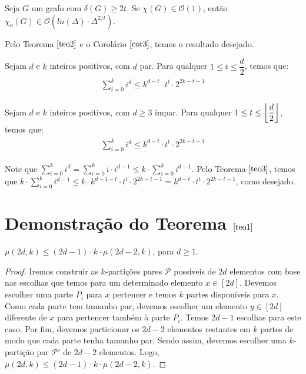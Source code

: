 \documentclass[12pt]{article}
\begin{document}
{\begin{cor}
	Seja $G$ um grafo com $\delta(G) \geq 2t$. Se $\chi(G) \in \mathcal{O}(1)$, então $\chi_o(G) \in \mathcal{O}(ln(\Delta) {\cdot} \Delta^{2/t}) $.
\end{cor}
	Pelo Teorema $\ref{teo2}$ e o Corolário $\ref{cor3}$, temos o resultado desejado. \newbegin

\begin{teo}
	\label{teo3}   
	Sejam $d$ e $k$ inteiros positivos, com $d$ par. Para qualquer $1 \leq t \leq \dfrac{d}{2}$, temos que: 
	\begin{align}
		\begin{split}
			\sum\limits_{i = 0}^{ k }i^{d}   \leq k^{d-t} {\cdot} t^t  {\cdot} 2^{2k-t-1} 
		\end{split} 
	\end{align}
	  
\end{teo} \newbegin

\begin{cor}
	Sejam $d$ e $k$ inteiros positivos, com $d \geq 3$ ímpar. Para qualquer $1 \leq t \leq \left \lfloor \dfrac{d}{2} \right \rfloor$, temos que: 
	\begin{align}
		\begin{split}
			\sum\limits_{i = 0}^{ k }i^{d}   \leq k^{d-t} {\cdot} t^t  {\cdot} 2^{2k-t-1} 
		\end{split} 
	\end{align}
\end{cor}

Note que $\sum\limits_{i = 0}^{ k }i^{d} = \sum\limits_{i = 0}^{ k }i {\cdot} i^{d-1} \leq k {\cdot} \sum\limits_{i = 0}^{ k } i^{d-1}$. Pelo Teorema $\ref{teo3}$, temos que $k {\cdot} \sum\limits_{i = 0}^{ k }i^{d-1} \leq k {\cdot} k^{d-1-t} {\cdot} t^t  {\cdot} 2^{2k-t-1} = k^{d-t} {\cdot} t^t  {\cdot} 2^{2k-t-1} $, como desejado. 

 \newpage
 
 \section{Demonstração do Teorema $\ref{teo1}$} \newl
 
 \begin{lema}  
 	\label{lema1} 
 	$\mu(2d, k) \leq (2d - 1) \cdot k \cdot \mu(2d - 2, k)$, para $d \geq 1$.
 \end{lema}
 
 \begin{proof} Iremos construir as $k$-partições pares $\mathcal{P}$ possíveis de $2d$ elementos com base nas escolhas que temos para um determinado elemento $x \in [2d]$. Devemos escolher uma parte $P_i$ para $x$ pertencer e temos $k$ partes disponíveis para $x$. Como cada parte tem tamanho par, devemos escolher um elemento $y \in [2d]$ diferente de $x$ para pertencer também à parte $P_i$. Temos $2d - 1$ escolhas para este caso. Por fim, devemos particionar os $2d - 2$ elementos restantes em $k$ partes de modo que cada parte tenha tamanho par. Sendo assim, devemos escolher uma $k$-partição par $\mathcal{P'}$ de $2d - 2$ elementos. Logo, $\mu(2d, k) \leq (2d - 1) \cdot k \cdot \mu(2d - 2, k)$. 
 	

\end{proof}}
\end{document}
